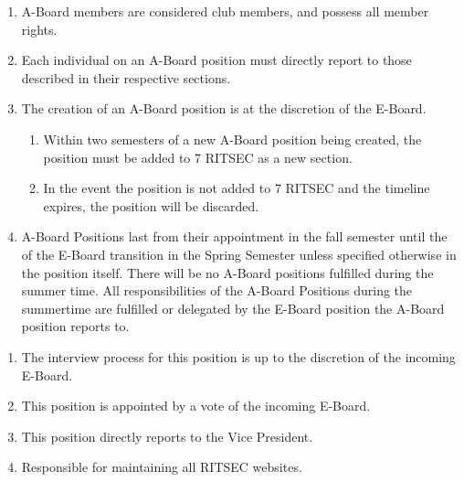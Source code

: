 

\begin{enumerate}
      \item A-Board members are considered club members, and possess all member rights.     
      \item Each individual on an A-Board position must directly report to those described
            in their respective sections.
      \item The creation of an A-Board position is at the discretion of the E-Board.
            \begin{enumerate}
                  \item Within two semesters of a new A-Board position being created, the position must
                        be added to 7 RITSEC as a new section.
                  \item In the event the position is not added to 7 RITSEC and the timeline expires,
                        the position will be discarded.
            \end{enumerate}
      \item A-Board Positions last from their appointment in the fall semester until the of the E-Board transition in the Spring Semester unless specified otherwise in the position itself. There will be no A-Board positions fulfilled during the summer time. All responsibilities of the A-Board Positions during the summertime are fulfilled or delegated by the E-Board position the A-Board position reports to.

\end{enumerate}


\begin{enumerate}
      \item The interview process for this position is up to the discretion of the incoming
            E-Board.
      \item This position is appointed by a vote of the incoming E-Board.
      \item This position directly reports to the Vice President.
      \item Responsible for maintaining all RITSEC websites.
\end{enumerate}

